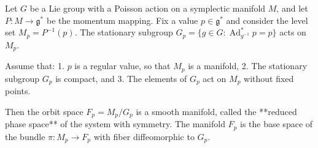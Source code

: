 Let $G$ be a Lie group with a Poisson action on a symplectic manifold $M$, and let $P: M \to \mathfrak{g}^*$ be the momentum mapping. Fix a value $p \in \mathfrak{g}^*$ and consider the level set $M_p = P^{-1}(p)$. The stationary subgroup $G_p = \{g \in G : \operatorname{Ad}_{g^{-1}}^* p = p\}$ acts on $M_p$.

Assume that:
1. $p$ is a regular value, so that $M_p$ is a manifold,
2. The stationary subgroup $G_p$ is compact, and
3. The elements of $G_p$ act on $M_p$ without fixed points.

Then the orbit space $F_p = M_p / G_p$ is a smooth manifold, called the **reduced phase space** of the system with symmetry. The manifold $F_p$ is the base space of the bundle $\pi: M_p \to F_p$ with fiber diffeomorphic to $G_p$.
